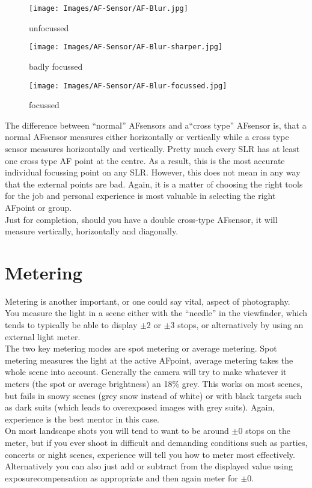 \begin{figure}[htb]
\begin{minipage}{.32\textwidth}
	\centering
	\texttt{[image: Images/AF-Sensor/AF-Blur.jpg]}
	\caption{unfocussed}
	\label{fig:AF-Blur}
\end{minipage}
\begin{minipage}{.32\textwidth}
	\centering
	\texttt{[image: Images/AF-Sensor/AF-Blur-sharper.jpg]}
	\caption{badly focussed}
	\label{fig:AF-Blur-sharper}
\end{minipage}
\begin{minipage}{.32\textwidth}
	\centering
	\texttt{[image: Images/AF-Sensor/AF-Blur-focussed.jpg]}
	\caption{focussed}
	\label{fig:AF-Blur-focussed}
\end{minipage}
\end{figure}

The difference between ``normal'' \glspl{AFsensor} and  a``cross type'' \gls{AFsensor} is, that a normal \gls{AFsensor} measures either horizontally or vertically while a cross type sensor measures horizontally and vertically. Pretty much every \gls{SLR} has at least one cross type \gls{AF} point at the centre. As a result, this is the most accurate individual focussing point on any \gls{SLR}. However, this does not mean in any way that the external points are bad. Again, it is a matter of choosing the right tools for the job and personal experience is most valuable in selecting the right \gls{AFpoint} or group.
\\[\baselineskip]
Just for completion, should you have a double cross-type \gls{AFsensor}, it will measure vertically, horizontally and diagonally.


\section{Metering}

Metering is another important, or one could say vital, aspect of photography.
\\
You measure the light in a scene either with the ``needle'' in the viewfinder, which tends to typically be able to display $\pm$2 or $\pm$3 stops, or alternatively by using an external light meter.
\\[\baselineskip]
The two key metering modes are spot metering or average metering. Spot metering measures the light at the active \gls{AFpoint}, average metering takes the whole scene into account.
Generally the camera will try to make whatever it meters (the spot or average brightness) an 18\% grey. This works on most scenes, but fails in snowy scenes (grey snow instead of white) or with black targets such as dark suits (which leads to overexposed images with grey suits). Again, experience is the best mentor in this case.
\\
On most landscape shots you will tend to want to be around $\pm$0 stops on the meter, but if you ever shoot in difficult and demanding conditions such as parties, concerts or night scenes, experience will tell you how to meter most effectively. Alternatively you can also just add or subtract from the displayed value using \gls{exposurecompensation} as appropriate and then again meter for $\pm$0.

